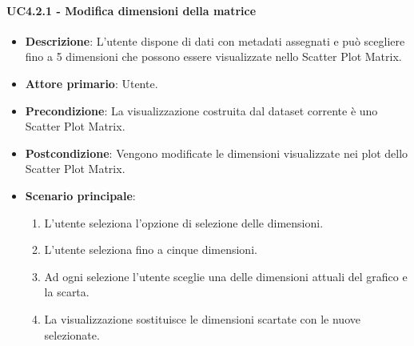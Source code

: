 \paragraph{UC4.2.1 - Modifica dimensioni della matrice}
\label{par:uc4.2.1}
\begin{itemize}
    \item \textbf{Descrizione}:     L’utente dispone di dati con metadati assegnati e può
                                    scegliere fino a 5 dimensioni che possono essere visualizzate nello Scatter Plot
                                    Matrix.

    \item \textbf{Attore primario}: Utente.

    \item \textbf{Precondizione}:   La visualizzazione costruita dal dataset corrente è uno Scatter Plot Matrix.
    \item \textbf{Postcondizione}:  Vengono modificate le dimensioni visualizzate nei plot dello Scatter Plot Matrix.

	\item \textbf{Scenario principale}:
        \begin{enumerate}
            \item   L'utente seleziona l'opzione di selezione delle dimensioni.
            \item   L'utente seleziona fino a cinque dimensioni.

            \item   Ad ogni selezione l'utente
                    sceglie una delle dimensioni attuali del grafico e la scarta.

            \item   La visualizzazione sostituisce le dimensioni scartate con le nuove selezionate.
        \end{enumerate}
\end{itemize}

